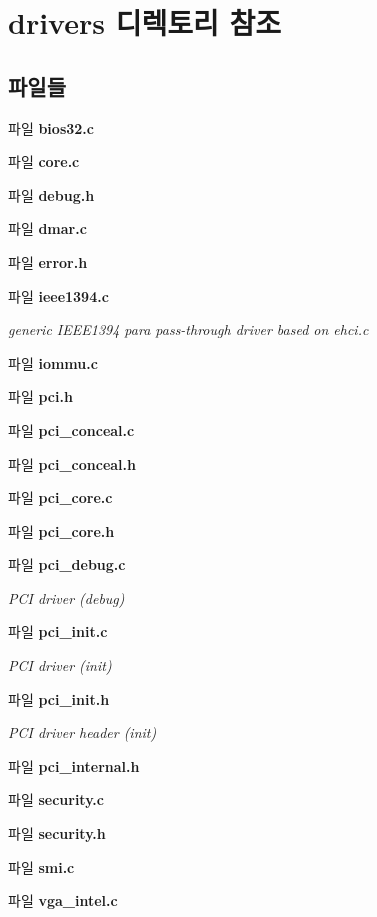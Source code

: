\section{drivers 디렉토리 참조}
\label{dir_14bc92f4b96c8519b376567118ac28b3}
\subsection*{파일들}
\begin{DoxyCompactItemize}
\item 
파일 {\bfseries bios32.\-c}
\item 
파일 {\bf core.\-c}
\item 
파일 {\bfseries debug.\-h}
\item 
파일 {\bfseries dmar.\-c}
\item 
파일 {\bfseries error.\-h}
\item 
파일 {\bf ieee1394.\-c}
\begin{DoxyCompactList}\small\item\em generic I\-E\-E\-E1394 para pass-\/through driver based on ehci.\-c \end{DoxyCompactList}\item 
파일 {\bfseries iommu.\-c}
\item 
파일 {\bfseries pci.\-h}
\item 
파일 {\bfseries pci\-\_\-conceal.\-c}
\item 
파일 {\bfseries pci\-\_\-conceal.\-h}
\item 
파일 {\bfseries pci\-\_\-core.\-c}
\item 
파일 {\bfseries pci\-\_\-core.\-h}
\item 
파일 {\bf pci\-\_\-debug.\-c}
\begin{DoxyCompactList}\small\item\em P\-C\-I driver (debug) \end{DoxyCompactList}\item 
파일 {\bf pci\-\_\-init.\-c}
\begin{DoxyCompactList}\small\item\em P\-C\-I driver (init) \end{DoxyCompactList}\item 
파일 {\bf pci\-\_\-init.\-h}
\begin{DoxyCompactList}\small\item\em P\-C\-I driver header (init) \end{DoxyCompactList}\item 
파일 {\bfseries pci\-\_\-internal.\-h}
\item 
파일 {\bfseries security.\-c}
\item 
파일 {\bfseries security.\-h}
\item 
파일 {\bfseries smi.\-c}
\item 
파일 {\bfseries vga\-\_\-intel.\-c}
\end{DoxyCompactItemize}
